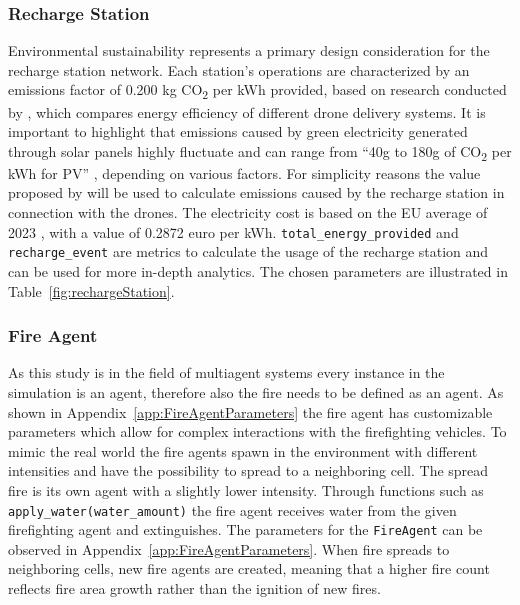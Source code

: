 \documentclass[11pt, a4paper]{article}
\begin{document}
\subsubsection{Recharge Station}
\label{sec:RechargeStation}
Environmental sustainability represents a primary design consideration for the recharge station network. Each station's operations are characterized by an emissions factor of 0.200 kg CO\textsubscript{2} per kWh provided, based on research conducted by \citet*{stolaroffEnergyUseLife2018}, which compares energy efficiency of different drone delivery systems. It is important to highlight that emissions caused by green electricity generated through solar panels highly fluctuate and can range from ``40g to 180g of CO\textsubscript{2} per kWh for PV'' \citep{GreenhousegasEmissionsSolar2007}, depending on various factors. For simplicity reasons the value proposed by  \citet*{stolaroffEnergyUseLife2018} will be used to calculate emissions caused by the recharge station in connection with the drones. The electricity cost is based on the EU average of 2023 \citep{ElectricityPriceStatistics}, with a value of 0.2872 euro per kWh. \texttt{total\_energy\_provided} and \texttt{recharge\_event} are metrics to calculate the usage of the recharge station and can be used for more in-depth analytics. The chosen parameters are illustrated in Table~\ref{fig:rechargeStation}.

\subsubsection{Fire Agent}
\label{sec:FireAgent}

As this study is in the field of multiagent systems every instance in the simulation is an agent, therefore also the fire needs to be defined as an agent. As shown in Appendix~\ref{app:FireAgentParameters} the fire agent has customizable parameters which allow for complex interactions with the firefighting vehicles. To mimic the real world the fire agents spawn in the environment with different intensities and have the possibility to spread to a neighboring cell. The spread fire is its own agent with a slightly lower intensity. Through functions such as \texttt{apply\_water(water\_amount)} the fire agent receives water from the given firefighting agent and extinguishes. The parameters for the \texttt{FireAgent} can be observed in Appendix~\ref{app:FireAgentParameters}. When fire spreads to neighboring cells, new fire agents are created, meaning that a higher fire count reflects fire area growth rather than the ignition of new fires.
\end{document}
